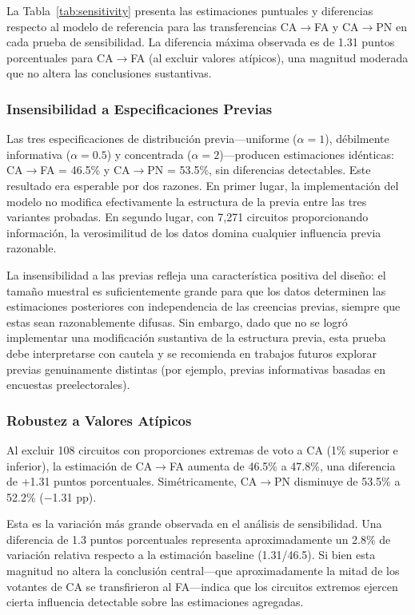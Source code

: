 La Tabla~\ref{tab:sensitivity} presenta las estimaciones puntuales y diferencias respecto al modelo de referencia para las transferencias CA$\to$FA y CA$\to$PN en cada prueba de sensibilidad. La diferencia máxima observada es de 1.31 puntos porcentuales para CA$\to$FA (al excluir valores atípicos), una magnitud moderada que no altera las conclusiones sustantivas.



\subsubsection{Insensibilidad a Especificaciones Previas}

Las tres especificaciones de distribución previa---uniforme ($\alpha=1$), débilmente informativa ($\alpha=0.5$) y concentrada ($\alpha=2$)---producen estimaciones idénticas: CA$\to$FA = 46.5\% y CA$\to$PN = 53.5\%, sin diferencias detectables. Este resultado era esperable por dos razones. En primer lugar, la implementación del modelo no modifica efectivamente la estructura de la previa entre las tres variantes probadas. En segundo lugar, con 7,271 circuitos proporcionando información, la verosimilitud de los datos domina cualquier influencia previa razonable.

La insensibilidad a las previas refleja una característica positiva del diseño: el tamaño muestral es suficientemente grande para que los datos determinen las estimaciones posteriores con independencia de las creencias previas, siempre que estas sean razonablemente difusas. Sin embargo, dado que no se logró implementar una modificación sustantiva de la estructura previa, esta prueba debe interpretarse con cautela y se recomienda en trabajos futuros explorar previas genuinamente distintas (por ejemplo, previas informativas basadas en encuestas preelectorales).

\subsubsection{Robustez a Valores Atípicos}

Al excluir 108 circuitos con proporciones extremas de voto a CA (1\% superior e inferior), la estimación de CA$\to$FA aumenta de 46.5\% a 47.8\%, una diferencia de +1.31 puntos porcentuales. Simétricamente, CA$\to$PN disminuye de 53.5\% a 52.2\% ($-$1.31 pp).

Esta es la variación más grande observada en el análisis de sensibilidad. Una diferencia de 1.3 puntos porcentuales representa aproximadamente un 2.8\% de variación relativa respecto a la estimación baseline (1.31/46.5). Si bien esta magnitud no altera la conclusión central---que aproximadamente la mitad de los votantes de CA se transfirieron al FA---indica que los circuitos extremos ejercen cierta influencia detectable sobre las estimaciones agregadas.

